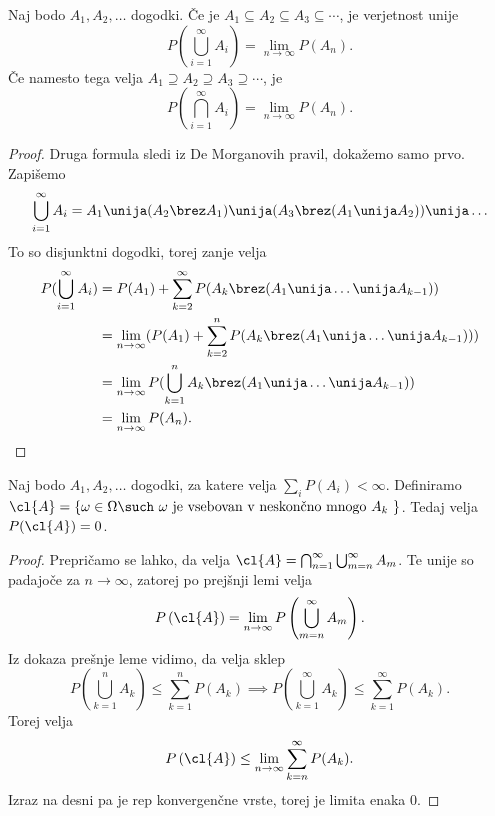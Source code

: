 
\begin{lema}
  Naj bodo $A_1, A_2, \ldots$ dogodki.
  Če je $A_1 \subseteq A_2 \subseteq A_3 \subseteq \cdots$, je verjetnost unije
  \[
    P(\bigcup_{i=1}^\infty A_i) = \lim_{n \to \infty} P(A_n).
  \]
  Če namesto tega velja $A_1 \supseteq A_2 \supseteq A_3 \supseteq \cdots$, je
  \[
    P(\bigcap_{i=1}^\infty A_i) = \lim_{n \to \infty} P(A_n).
  \]
\end{lema}

\begin{proof}
  Druga formula sledi iz De Morganovih pravil, dokažemo samo prvo.
  Zapišemo
  \[
    \bigcup_{i=1}^\infty A_i = A_1 \unija (A_2 \brez A_1) \unija (A_3 \brez (A_1
    \unija A_2)) \unija \ldots
  \]
  To so disjunktni dogodki, torej zanje velja
  \begin{align*}
    P(\bigcup_{i=1}^\infty A_i) &= P(A_1) + \sum_{k=2}^\infty P(A_k \brez (A_1 \unija \ldots \unija A_{k-1})) \\
                                &= \lim_{n \to \infty} (P(A_1) + \sum_{k=2}^n P(A_k \brez (A_1 \unija \ldots \unija A_{k-1}))) \\
                                &= \lim_{n \to \infty} P(\bigcup_{k=1}^n A_k \brez (A_1 \unija \ldots \unija A_{k-1})) \\
                                &= \lim_{n \to \infty} P(A_n).
  \end{align*}
\end{proof}

\begin{lema}
  Naj bodo $A_1, A_2, \ldots$ dogodki, za katere velja $\sum_i P(A_i) < \infty$.
  Definiramo $\cl{A} = \{\omega \in \Omega \such \text{ \(\omega\) je vsebovan v
    neskončno mnogo \(A_k\) }\}$.
  Tedaj velja $P(\cl{A}) = 0$.
\end{lema}

\begin{proof}
  Prepričamo se lahko, da velja $\cl{A} = \bigcap_{n=1}^\infty
  \bigcup_{m=n}^\infty A_m$.
  Te unije so padajoče za $n \to \infty$, zatorej po prejšnji lemi velja
  \[
    P\left(\cl{A}\right) = \lim_{n \to \infty} P\left(\bigcup_{m=n}^\infty A_m\right).
  \]
  Iz dokaza prešnje leme vidimo, da velja sklep
  \[
    P\left(\bigcup_{k=1}^n A_k\right) \le \sum_{k=1}^n P(A_k)
    \implies P\left(\bigcup_{k=1}^\infty A_k\right) \le \sum_{k=1}^\infty P(A_k).
  \]
  Torej velja
  \[
    P\left(\cl{A}\right) \le \lim_{n \to \infty} \sum_{k=n}^\infty P(A_k).
  \]
  Izraz na desni pa je rep konvergenčne vrste, torej je limita enaka $0$.
\end{proof}

